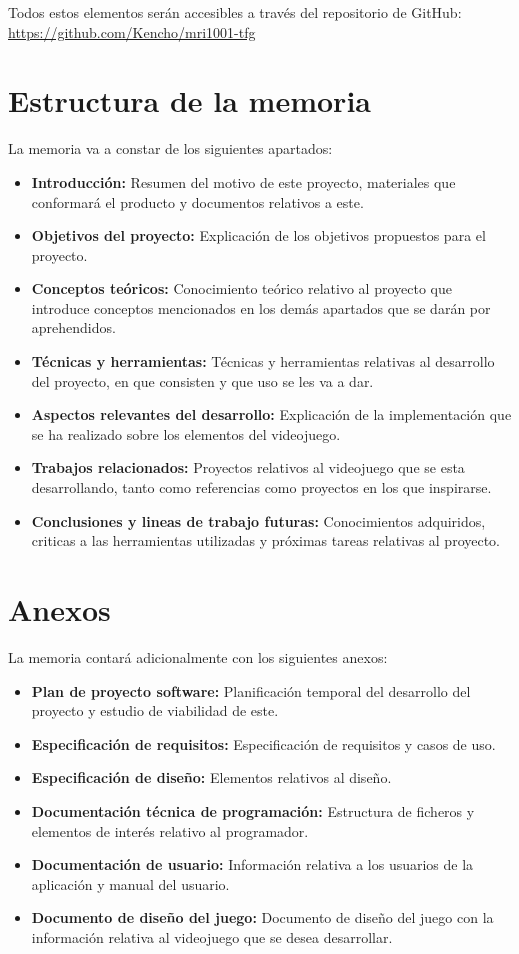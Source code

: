 Todos estos elementos serán accesibles a través del repositorio de GitHub: \url{https://github.com/Kencho/mri1001-tfg}

\section{Estructura de la memoria}
La memoria va a constar de los siguientes apartados:
\begin{itemize}
\item
\textbf{Introducción:} Resumen del motivo de este proyecto, materiales que conformará el producto y documentos relativos a este.
\item
\textbf{Objetivos del proyecto:} Explicación de los objetivos propuestos para el proyecto.
\item
\textbf{Conceptos teóricos:} Conocimiento teórico relativo al proyecto que introduce conceptos mencionados en los demás apartados que se darán por aprehendidos.
\item
\textbf{Técnicas y herramientas:} Técnicas y herramientas relativas al desarrollo del proyecto, en que consisten y que uso se les va a dar.
\item
\textbf{Aspectos relevantes del desarrollo:} Explicación de la implementación que se ha realizado sobre los elementos del videojuego.
\item
\textbf{Trabajos relacionados:} Proyectos relativos al videojuego que se esta desarrollando, tanto como referencias como proyectos en los que inspirarse.
\item
\textbf{Conclusiones y lineas de trabajo futuras:} Conocimientos adquiridos, criticas a las herramientas utilizadas y próximas tareas relativas al proyecto.
\end{itemize}

\section{Anexos}
La memoria contará adicionalmente con los siguientes anexos:
\begin{itemize}
\item
\textbf{Plan de proyecto software:} Planificación temporal del desarrollo del proyecto y estudio de viabilidad de este.
\item
\textbf{Especificación de requisitos:} Especificación de requisitos y casos de uso.
\item
\textbf{Especificación de diseño:} Elementos relativos al diseño.
\item
\textbf{Documentación técnica de programación:} Estructura de ficheros y elementos de interés relativo al programador.
\item
\textbf{Documentación de usuario:} Información relativa a los usuarios de la aplicación y manual del usuario.
\item
\textbf{Documento de diseño del juego:} Documento de diseño del juego con la información relativa al videojuego que se desea desarrollar.
\end{itemize}